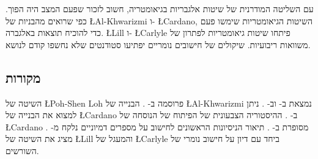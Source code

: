 עם השליטה המודרנית של שיטות אלגבריות בגיאומטריה, חשוב לזכור שפעם המצב היה הפוך. כפי שרואים מהבניות של
\L{Al-Khwarizmi}
ו-%
\L{Cardano},
השיטות הגיאומטריות שימשו פעם כדי להוכיח תוצאות באלגברה. 
\L{Lill}
ו-%
\L{Carlyle}
פיתחו שיטות גיאומטריות לפתרון של משוואות ריבועיות.
שיקולים של חישובים נומריים יפתיעו סטודנטים שלא נחשפו קודם לנושא.

\subsection*{מקורות}
השיטה של
\L{Poh-Shen Loh}
פרוסמה ב-%
\cite{loh1,loh2}.
הבנייה של
\L{Al-Khwarizmi}
נמצאת ב-%
\cite[פרק 1]{jorg}
וב-%
\cite{mastin}.
ניתן למצוא את הבנייה של 
\L{Cardano}
ב-%
\cite[פרק 1]{jorg}.
ההיסטוריה הצבעונית של הפיתוח של הנוסחה של
\L{Cardano}
מסופרת ב-%
\cite{wiki:cardano}.
תיאור הניסיונות הראשונים לחישוב על מספרים דמיוניים נלקח מ-%
\cite[פרק 2]{jorg}. 
\cite{wiki:quadratic}
מציג את השיטה של 
\L{Lill}
והמעגל של 
\L{Carlyle}
ביחד עם דיון על חישוב נומרי של השורשים.

